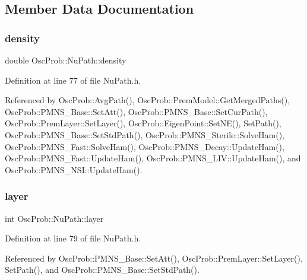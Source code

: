 \subsection{Member Data Documentation}
\mbox{\label{structOscProb_1_1NuPath_a54ddd451db69bc54434de3cf18a117ca}} 
\subsubsection{\texorpdfstring{density}{density}}
{\footnotesize\ttfamily double Osc\+Prob\+::\+Nu\+Path\+::density}



Definition at line 77 of file Nu\+Path.\+h.



Referenced by Osc\+Prob\+::\+Avg\+Path(), Osc\+Prob\+::\+Prem\+Model\+::\+Get\+Merged\+Paths(), Osc\+Prob\+::\+P\+M\+N\+S\+\_\+\+Base\+::\+Set\+Att(), Osc\+Prob\+::\+P\+M\+N\+S\+\_\+\+Base\+::\+Set\+Cur\+Path(), Osc\+Prob\+::\+Prem\+Layer\+::\+Set\+Layer(), Osc\+Prob\+::\+Eigen\+Point\+::\+Set\+N\+E(), Set\+Path(), Osc\+Prob\+::\+P\+M\+N\+S\+\_\+\+Base\+::\+Set\+Std\+Path(), Osc\+Prob\+::\+P\+M\+N\+S\+\_\+\+Sterile\+::\+Solve\+Ham(), Osc\+Prob\+::\+P\+M\+N\+S\+\_\+\+Fast\+::\+Solve\+Ham(), Osc\+Prob\+::\+P\+M\+N\+S\+\_\+\+Decay\+::\+Update\+Ham(), Osc\+Prob\+::\+P\+M\+N\+S\+\_\+\+Fast\+::\+Update\+Ham(), Osc\+Prob\+::\+P\+M\+N\+S\+\_\+\+L\+I\+V\+::\+Update\+Ham(), and Osc\+Prob\+::\+P\+M\+N\+S\+\_\+\+N\+S\+I\+::\+Update\+Ham().

\mbox{\label{structOscProb_1_1NuPath_a442b160899e554ad1d800989510d5309}} 
\subsubsection{\texorpdfstring{layer}{layer}}
{\footnotesize\ttfamily int Osc\+Prob\+::\+Nu\+Path\+::layer}



Definition at line 79 of file Nu\+Path.\+h.



Referenced by Osc\+Prob\+::\+P\+M\+N\+S\+\_\+\+Base\+::\+Set\+Att(), Osc\+Prob\+::\+Prem\+Layer\+::\+Set\+Layer(), Set\+Path(), and Osc\+Prob\+::\+P\+M\+N\+S\+\_\+\+Base\+::\+Set\+Std\+Path().

